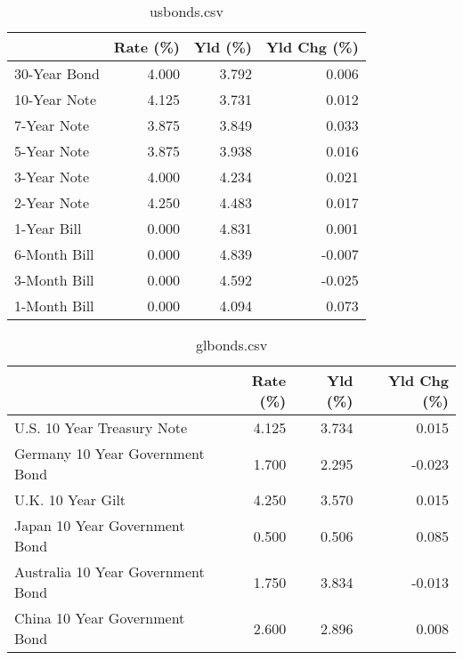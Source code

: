 \documentclass{article}%
\begin{document}
%


\begin{table}[htbp]%
\caption{usbonds.csv}%
\centering%
\begin{adjustbox}{width=1\textwidth}%
\begin{tabular}{lrrr}
\toprule
             &  Rate (\%) &  Yld (\%) &  Yld Chg (\%) \\
\midrule
30-Year Bond &     4.000 &    3.792 &        0.006 \\
10-Year Note &     4.125 &    3.731 &        0.012 \\
 7-Year Note &     3.875 &    3.849 &        0.033 \\
 5-Year Note &     3.875 &    3.938 &        0.016 \\
 3-Year Note &     4.000 &    4.234 &        0.021 \\
 2-Year Note &     4.250 &    4.483 &        0.017 \\
 1-Year Bill &     0.000 &    4.831 &        0.001 \\
6-Month Bill &     0.000 &    4.839 &       -0.007 \\
3-Month Bill &     0.000 &    4.592 &       -0.025 \\
1-Month Bill &     0.000 &    4.094 &        0.073 \\
\bottomrule
\end{tabular}
%
\end{adjustbox}%
\end{table}

%


\begin{table}[htbp]%
\caption{glbonds.csv}%
\centering%
\begin{adjustbox}{width=1\textwidth}%
\begin{tabular}{lrrr}
\toprule
                                  &  Rate (\%) &  Yld (\%) &  Yld Chg (\%) \\
\midrule
       U.S. 10 Year Treasury Note &     4.125 &    3.734 &        0.015 \\
  Germany 10 Year Government Bond &     1.700 &    2.295 &       -0.023 \\
                U.K. 10 Year Gilt &     4.250 &    3.570 &        0.015 \\
    Japan 10 Year Government Bond &     0.500 &    0.506 &        0.085 \\
Australia 10 Year Government Bond &     1.750 &    3.834 &       -0.013 \\
    China 10 Year Government Bond &     2.600 &    2.896 &        0.008 \\
\bottomrule
\end{tabular}
%
\end{adjustbox}%
\end{table}
\end{document}
